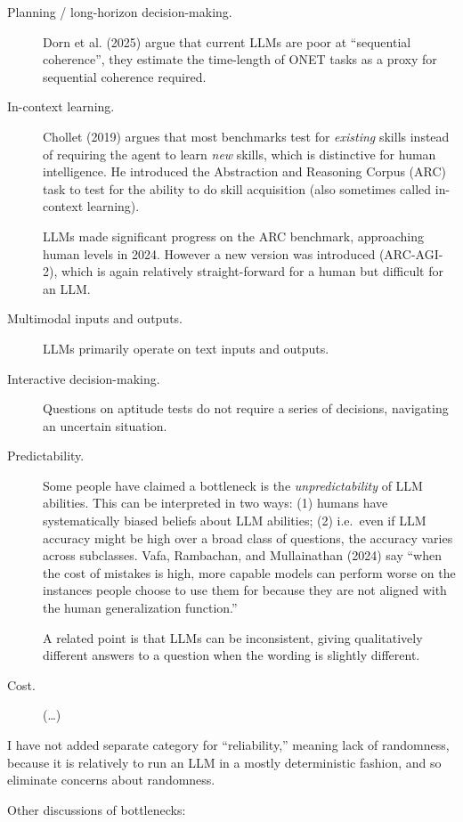 \documentclass[
  letterpaper,
  DIV=11,
  numbers=noendperiod,
  oneside]{scrartcl}
\begin{document}
\begin{description}
\item[Planning / long-horizon decision-making.]
Dorn et al. (2025) argue that current LLMs are poor at ``sequential
coherence'', they estimate the time-length of ONET tasks as a proxy for
sequential coherence required.
\item[In-context learning.]
Chollet (2019) argues that most benchmarks test for \emph{existing}
skills instead of requiring the agent to learn \emph{new} skills, which
is distinctive for human intelligence. He introduced the Abstraction and
Reasoning Corpus (ARC) task to test for the ability to do skill
acquisition (also sometimes called in-context learning).

LLMs made significant progress on the ARC benchmark, approaching human
levels in 2024. However a new version was introduced (ARC-AGI-2), which
is again relatively straight-forward for a human but difficult for an
LLM.
\item[Multimodal inputs and outputs.]
LLMs primarily operate on text inputs and outputs.
\item[Interactive decision-making.]
Questions on aptitude tests do not require a series of decisions,
navigating an uncertain situation.
\item[Predictability.]
Some people have claimed a bottleneck is the \emph{unpredictability} of
LLM abilities. This can be interpreted in two ways: (1) humans have
systematically biased beliefs about LLM abilities; (2) i.e.~even if LLM
accuracy might be high over a broad class of questions, the accuracy
varies across subclasses. Vafa, Rambachan, and Mullainathan (2024) say
``when the cost of mistakes is high, more capable models can perform
worse on the instances people choose to use them for because they are
not aligned with the human generalization function.''

A related point is that LLMs can be inconsistent, giving qualitatively
different answers to a question when the wording is slightly different.
\item[Cost.]
(\ldots)
\end{description}

I have not added separate category for ``reliability,'' meaning lack of
randomness, because it is relatively to run an LLM in a mostly
deterministic fashion, and so eliminate concerns about randomness.

Other discussions of bottlenecks:
\end{document}
